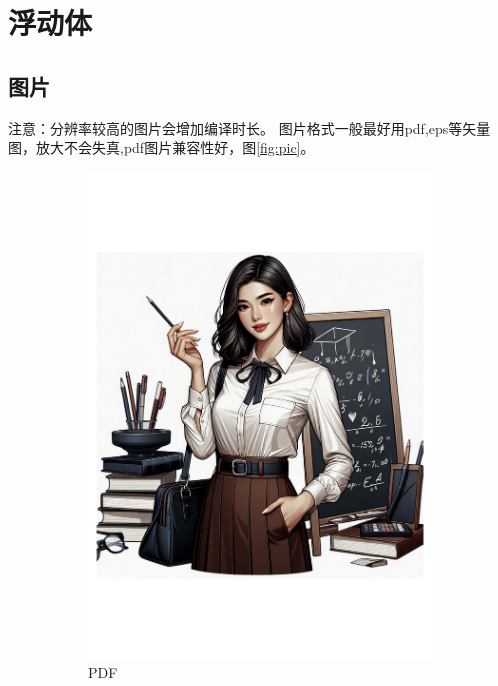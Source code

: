 \section{浮动体}
\subsection{图片}
注意：分辨率较高的图片会增加编译时长。
图片格式一般最好用pdf,eps等矢量图，放大不会失真,pdf图片兼容性好，图\ref{fig:pic}。
\begin{figure}[!ht]
    \centering
    \begin{subfigure}[b]{0.32\textwidth}
        \includegraphics[width=\textwidth]{figures/float_exp_ai}
        \caption{PDF}
        \end{subfigure}
    \begin{subfigure}[b]{0.32\textwidth}

\end{subfigure}
\end{figure}
